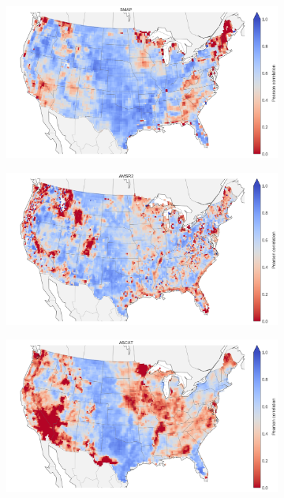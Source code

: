 \documentclass[hess, manuscript]{copernicus}
\begin{document}
\begin{figure}
   \centering
   \begin{subfigure}[t]{0.55\textwidth}
       \centering
       \includegraphics[width=\textwidth]{figures/results/corr_SMAP_MERRA2}
       \caption{}
       \label{fig:spatialplot-correlation-SMAP}
   \end{subfigure}
   \hfill
   \begin{subfigure}[t]{0.55\textwidth}
       \centering
       \includegraphics[width=\textwidth]{figures/results/corr_AMSR2_MERRA2}
       \caption{}
       \label{fig:spatialplot-correlation-AMSR2}
   \end{subfigure}
   \hfill
   \begin{subfigure}[t]{0.55\textwidth}
       \centering
       \includegraphics[width=\textwidth]{figures/results/corr_ASCAT_MERRA2}

\end{subfigure}
\end{figure}
\end{document}
